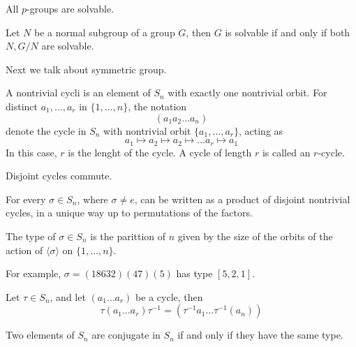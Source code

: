 \documentclass[openany]{book}
\newcommand{\la}{\langle}
\newcommand{\ra}{\rangle}
\begin{document}
\begin{cor}
    All $p$-groups are solvable.
\end{cor}
\begin{cor}
    Let $N$ be a normal subgroup of a group $G$, then $G$ is solvable if and only if both $N, G/N$ are solvable.
\end{cor}
Next we talk about symmetric group.
\begin{defn}[cycle]
    A nontrivial cycli is an element of $S_n$ with exactly one nontrivial orbit. For distinct $a_1, \dots, a_r$ in $\{1,\dots,n\}$, the notation 
    \begin{equation*}
        (a_1a_2\dots a_n)
    \end{equation*}
    denote the cycle in $S_n$ with nontrivial orbit $\{a_1,\dots, a_r\}$, acting as 
    \begin{equation*}
        a_1\mapsto a_2\mapsto a_2\mapsto \dots a_r\mapsto a_1
    \end{equation*}
    In this case, $r$ is the lenght of the cycle. A cycle of length $r$ is called an $r$-cycle.
\end{defn}
\begin{lem}
    Disjoint cycles commute.
\end{lem}
\begin{lem}
    For every $\sigma\in S_n$, where $\sigma\neq e$, can be written as a product of disjoint nontrivial cycles, in a unique way up to permutations of the factors.
\end{lem}

\begin{defn}[type]
    The type of $\sigma\in S_n$ is the parittion of $n$ given by the size of the orbits of the action of $\la \sigma\ra$ on $\{1,\dots,n\}$.

    For example, $\sigma=(18632)(47)(5)$ has type $[5,2,1]$.
\end{defn}
\begin{lem}
    Let $\tau\in S_n$, and let $(a_1\dots a_r)$ be a cycle, then 
    \begin{equation*}
        \tau(a_1\dots a_r)\tau^{-1}=(\tau^{-1}a_1\dots\tau^{-1}(a_n))
    \end{equation*}
\end{lem}
\begin{prop}
    Two elements of $S_n$ are conjugate in $S_n$ if and only if they have the same type.
\end{prop}
\end{document}
